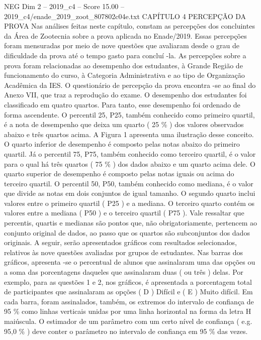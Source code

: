 \begin{textsample}{NEG Dim 2 – 2019\_c4 – Score 15.00 – 2019\_c4/enade\_2019\_zoot\_807802c04e.txt}  \label{ex:f2_neg_386}
CAPÍTULO 4 PERCEPÇÃO DA PROVA Nas análises feitas neste capítulo, constam as percepções dos concluintes da Área de Zootecnia sobre a prova aplicada no Enade/2019.
Essas percepções foram mensuradas por meio de nove questões que avaliaram desde o grau de dificuldade da prova até o tempo gasto para concluí -la.
As percepções sobre a prova foram relacionadas ao desempenho dos estudantes, à Grande Região de funcionamento do curso, à Categoria Administrativa e ao tipo de Organização Acadêmica da IES.
O questionário de percepção da prova encontra -se ao final do Anexo VII, que traz a reprodução do exame.
O desempenho dos estudantes foi classificado em quatro quartos.
Para tanto, esse desempenho foi ordenado de forma ascendente.
O percentil 25, P25, também conhecido como primeiro quartil, é a nota de desempenho que deixa um quarto ( 25 \% ) dos valores observados abaixo e três quartos acima.
A Figura 1 apresenta uma ilustração desse conceito.
O quarto inferior de desempenho é composto pelas notas abaixo do primeiro quartil.
Já o percentil 75, P75, também conhecido como terceiro quartil, é o valor para o qual há três quartos ( 75 \% ) dos dados abaixo e um quarto acima dele.
O quarto superior de desempenho é composto pelas notas iguais ou acima do terceiro quartil.
O percentil 50, P50, também conhecido como mediana, é o valor que divide as notas em dois conjuntos de igual tamanho.
O segundo quarto inclui valores entre o primeiro quartil ( P25 ) e a mediana.
O terceiro quarto contém os valores entre a mediana ( P50 ) e o terceiro quartil ( P75 ).
Vale ressaltar que percentis, quartis e medianas são pontos que, não obrigatoriamente, pertencem ao conjunto original de dados, ao passo que os quartos são subconjuntos dos dados originais.
A seguir, serão apresentados gráficos com resultados selecionados, relativos às nove questões avaliadas por grupos de estudantes.
Nas barras dos gráficos, apresenta -se o percentual de alunos que assinalaram uma das opções ou a soma das porcentagens daqueles que assinalaram duas ( ou três ) delas.
Por exemplo, para as questões 1 e 2, nos gráficos, é apresentada a porcentagem total de participantes que assinalaram as opções ( D ) Difícil e ( E ) Muito difícil.
Em cada barra, foram assinalados, também, os extremos do intervalo de confiança de 95 \% como linhas verticais unidas por uma linha horizontal na forma da letra H maiúscula.
O estimador de um parâmetro com um certo nível de confiança ( e.g. 95,0 \% ) deve conter o parâmetro no intervalo de confiança em 95 \% das vezes.

\end{textsample}
